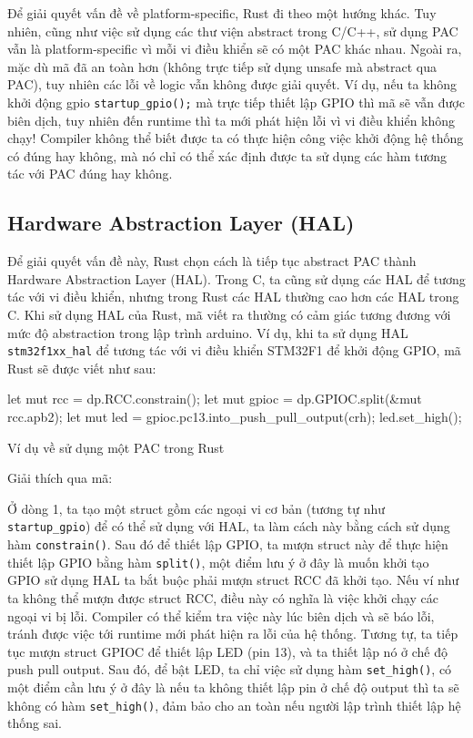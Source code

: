 Để giải quyết vấn đề về platform-specific, Rust đi theo một hướng khác.
Tuy nhiên, cũng như việc sử dụng các thư viện abstract trong C/C++, sử dụng PAC vẫn là platform-specific vì mỗi vi điều khiển sẽ có một PAC khác nhau.
Ngoài ra, mặc dù mã đã an toàn hơn (không trực tiếp sử dụng unsafe mà abstract qua PAC), tuy nhiên các lỗi về logic vẫn không được giải quyết.
Ví dụ, nếu ta không khởi động gpio \texttt{startup_gpio();} mà trực tiếp thiết lập GPIO thì mã sẽ vẫn được biên dịch, tuy nhiên đến runtime thì ta mới phát hiện lỗi vì vi điều khiển không chạy!
Compiler không thể biết được ta có thực hiện công việc khởi động hệ thống có đúng hay không, mà nó chỉ có thể xác định được ta sử dụng các hàm tương tác với PAC đúng hay không.

\subsection{Hardware Abstraction Layer (HAL)}
Để giải quyết vấn đề này, Rust chọn cách là tiếp tục abstract PAC thành Hardware Abstraction Layer (HAL).
Trong C, ta cũng sử dụng các HAL để tương tác với vi điều khiển, nhưng trong Rust các HAL thường cao hơn các HAL trong C.
Khi sử dụng HAL của Rust, mã viết ra thường có cảm giác tương đương với mức độ abstraction trong lập trình arduino.
Ví dụ, khi ta sử dụng HAL \texttt{stm32f1xx\_hal} để tương tác với vi điều khiển STM32F1 để khởi động GPIO, mã Rust sẽ được viết như sau:
\begin{listing}[ht]
\begin{rustcode}
let mut rcc = dp.RCC.constrain();
let mut gpioc = dp.GPIOC.split(&mut rcc.apb2);
let mut led = gpioc.pc13.into_push_pull_output(crh);
led.set_high();
\end{rustcode}
\caption{Ví dụ về sử dụng một PAC trong Rust}
\end{listing}

Giải thích qua mã:

Ở dòng 1, ta tạo một struct gồm các ngoại vi cơ bản (tương tự như \texttt{startup_gpio}) để có thể sử dụng với HAL, ta làm cách này bằng cách sử dụng hàm \texttt{constrain()}.
Sau đó để thiết lập GPIO, ta mượn struct này để thực hiện thiết lập GPIO bằng hàm \texttt{split()}, một điểm lưu ý ở đây là muốn khởi tạo GPIO sử dụng HAL ta bắt buộc phải mượn struct RCC đã khởi tạo.
Nếu ví như ta không thể mượn được struct RCC, điều này có nghĩa là việc khởi chạy các ngoại vi bị lỗi.
Compiler có thể kiểm tra việc này lúc biên dịch và sẽ báo lỗi, tránh được việc tới runtime mới phát hiện ra lỗi của hệ thống.
Tương tự, ta tiếp tục mượn struct GPIOC để thiết lập LED (pin 13), và ta thiết lập nó ở chế độ push pull output.
Sau đó, để bật LED, ta chỉ việc sử dụng hàm \texttt{set_high()}, có một điểm cần lưu ý ở đây là nếu ta không thiết lập pin ở chế độ output thì ta sẽ không có hàm \texttt{set_high()}, đảm bảo cho an toàn nếu người lập trình thiết lập hệ thống sai.

